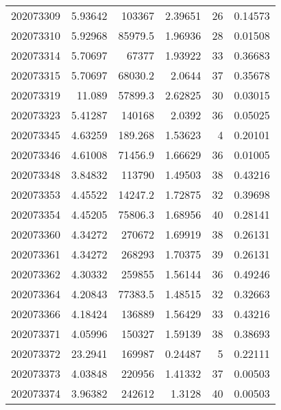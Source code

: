 \begin{tabular}{rrrrrr}
 202073309 &          5.93642 &   103367      &            2.39651 &          26 & 0.14573 \\
 202073310 &          5.92968 &    85979.5    &            1.96936 &          28 & 0.01508 \\
 202073314 &          5.70697 &    67377      &            1.93922 &          33 & 0.36683 \\
 202073315 &          5.70697 &    68030.2    &            2.0644  &          37 & 0.35678 \\
 202073319 &         11.089   &    57899.3    &            2.62825 &          30 & 0.03015 \\
 202073323 &          5.41287 &   140168      &            2.0392  &          36 & 0.05025 \\
 202073345 &          4.63259 &      189.268  &            1.53623 &           4 & 0.20101 \\
 202073346 &          4.61008 &    71456.9    &            1.66629 &          36 & 0.01005 \\
 202073348 &          3.84832 &   113790      &            1.49503 &          38 & 0.43216 \\
 202073353 &          4.45522 &    14247.2    &            1.72875 &          32 & 0.39698 \\
 202073354 &          4.45205 &    75806.3    &            1.68956 &          40 & 0.28141 \\
 202073360 &          4.34272 &   270672      &            1.69919 &          38 & 0.26131 \\
 202073361 &          4.34272 &   268293      &            1.70375 &          39 & 0.26131 \\
 202073362 &          4.30332 &   259855      &            1.56144 &          36 & 0.49246 \\
 202073364 &          4.20843 &    77383.5    &            1.48515 &          32 & 0.32663 \\
 202073366 &          4.18424 &   136889      &            1.56429 &          33 & 0.43216 \\
 202073371 &          4.05996 &   150327      &            1.59139 &          38 & 0.38693 \\
 202073372 &         23.2941  &   169987      &            0.24487 &           5 & 0.22111 \\
 202073373 &          4.03848 &   220956      &            1.41332 &          37 & 0.00503 \\
 202073374 &          3.96382 &   242612      &            1.3128  &          40 & 0.00503 \\

\end{tabular}
